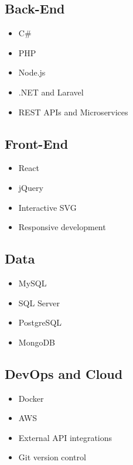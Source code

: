 \documentclass[11pt,a4paper]{article}
\begin{document}
\begin{minipage}[t]{0.48\textwidth}
    \subsection{Back-End}
    \begin{itemize}[leftmargin=15pt, topsep=0pt, itemsep=1pt]
        \item C\#
        \item PHP
        \item Node.js
        \item .NET and Laravel
        \item REST APIs and Microservices
    \end{itemize}
    
    \vspace{8pt}
    
    \subsection{Front-End}
    \begin{itemize}[leftmargin=15pt, topsep=0pt, itemsep=1pt]
        \item React
        \item jQuery
        \item Interactive SVG
        \item Responsive development
    \end{itemize}
\end{minipage}
\hfill
\begin{minipage}[t]{0.48\textwidth}
    \subsection{Data}
    \begin{itemize}[leftmargin=15pt, topsep=0pt, itemsep=1pt]
        \item MySQL
        \item SQL Server
        \item PostgreSQL
        \item MongoDB
    \end{itemize}
    
    \vspace{8pt}
    
    \subsection{DevOps and Cloud}
    \begin{itemize}[leftmargin=15pt, topsep=0pt, itemsep=1pt]
        \item Docker
        \item AWS
        \item External API integrations
        \item Git version control
    \end{itemize}
\end{minipage}
\end{document}
